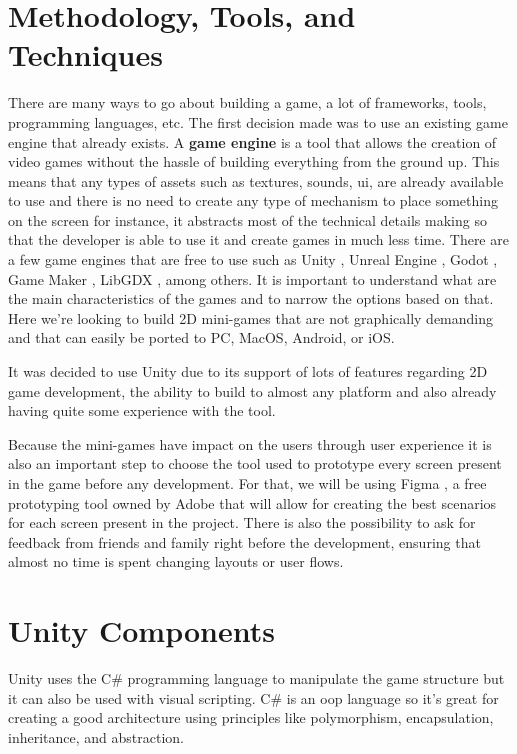 
\section{Methodology, Tools, and Techniques}
\label{methodology}
There are many ways to go about building a game, a lot of frameworks, tools, programming languages, etc. The first decision made was to use an existing game engine that already exists. A \textbf{game engine} is a tool that allows the creation of video games without the hassle of building everything from the ground up. This means that any types of assets such as textures, sounds, \gls{ui}, are already available to use and there is no need to create any type of mechanism to place something on the screen for instance, it abstracts most of the technical details making so that the developer is able to use it and create games in much less time. There are a few game engines that are free to use such as Unity \cite{unity}, Unreal Engine \cite{unrealengine}, Godot \cite{godot}, Game Maker \cite{gamemaker}, LibGDX \cite{libgdx}, among others.
It is important to understand what are the main characteristics of the games and to narrow the options based on that.
Here we're looking to build 2D mini-games that are not graphically demanding and that can easily be ported to PC, MacOS, Android, or iOS.

It was decided to use Unity due to its support of lots of features regarding 2D game development, the ability to build to almost any platform and also already having quite some experience with the tool.

Because the mini-games have impact on the users through user experience it is also an important step to choose the tool used to prototype every screen present in the game before any development. For that, we will be using Figma \cite{figma}, a free prototyping tool owned by Adobe that will allow for creating the best scenarios for each screen present in the project. There is also the possibility to ask for feedback from friends and family right before the development, ensuring that almost no time is spent changing layouts or user flows.

\section{Unity Components}
Unity uses the C\# programming language to manipulate the game structure but it can also be used with visual scripting. C\# is an \gls{oop} language so it's great for creating a good architecture using principles like polymorphism, encapsulation, inheritance, and abstraction.

